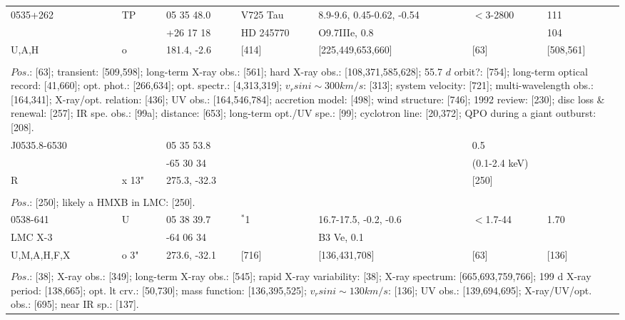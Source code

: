\documentclass{aa}
\begin{document}
\begin{table*}[h]
\begin{tabular}{p{2.5cm}p{1cm}p{1.8cm}p{2.3cm}p{3.3cm}p{2.0cm}p{2.2cm}}
\noalign{\smallskip}
\hline
\noalign{\smallskip}
 0535+262   &  TP   & 05 35 48.0  & V725 Tau      & 8.9-9.6, 0.45-0.62, -0.54 & $<$3-2800   & 111       \\
                      &          & +26 17 18   & HD 245770    & O9.7IIIe, 0.8                     &                       & 104       \\
U,A,H           &  o      & 181.4, -2.6  & [414]               & [225,449,653,660]           & [63]               & [508,561] \\
\\  
\multicolumn{7}{p{17.5cm}}{
$Pos$.: [63]; transient: [509,598]; long-term X-ray obs.: [561]; hard X-ray obs.: [108,371,585,628]; 55.7 $d$ orbit?: [754];
long-term optical record: [41,660]; opt. phot.: [266,634]; opt. spectr.: [4,313,319]; $v_rsin i \sim 300 km/s$: [313]; system 
velocity: [721]; multi-wavelength obs.: [164,341]; X-ray/opt. relation: [436]; UV obs.: [164,546,784]; accretion model: [498];
 wind structure: [746]; 1992 review: [230]; disc loss \& renewal: [257]; IR spe. obs.: [99a]; distance: [653]; 
long-term opt./UV spe.: [99]; cyclotron line: [20,372]; QPO during a giant outburst: [208].   }\\

\noalign{\smallskip}
\hline
\noalign{\smallskip}
J0535.8-6530     &             &  05 35 53.8   &                     &             &  0.5                       &  \\
                              &             & -65 30 34      &                     &             &  (0.1-2.4 keV)     &     \\          
     R                      & x 13"   & 275.3, -32.3  &                     &            &   [250]                    &     \\
  
\\
\multicolumn{7}{p{17.5cm}}{
$Pos$.: [250]; likely a HMXB in LMC: [250].                 }\\

\noalign{\smallskip}
\hline
\noalign{\smallskip}
 0538-641     &  U       & 05 38 39.7      & $^*$1                & 16.7-17.5, -0.2, -0.6   &  $<$1.7-44        &  1.70         \\
 LMC X-3      &           & -64 06 34         &                           & B3 Ve, 0.1                   &                           &                   \\
U,M,A,H,F,X  &  o 3" & 273.6, -32.1      &     [716]           &    [136,431,708]       &        [63]             &   [136]       \\
\\
\multicolumn{7}{p{17.5cm}}{
$Pos$.: [38]; X-ray obs.: [349]; long-term X-ray obs.: [545]; rapid X-ray variability: [38]; X-ray spectrum: [665,693,759,766]; 
199 d X-ray period: [138,665]; opt. lt crv.: [50,730]; mass function: [136,395,525]; $v_rsin i \sim 130 km/s$: [136]; UV obs.: 
[139,694,695]; X-ray/UV/opt. obs.: [695]; near IR sp.: [137].}\\


\end{tabular}
\end{table*}
\end{document}
